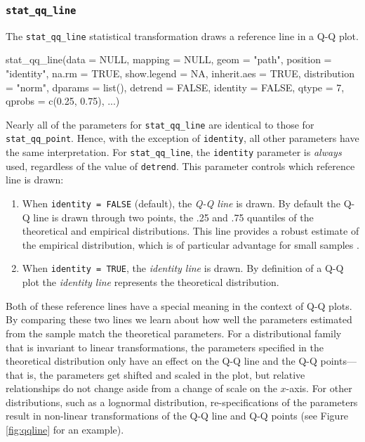 \subsubsection{\texorpdfstring{\texttt{stat\_qq\_line}}{stat\_qq\_line}}\label{stat_qq_line}

The \texttt{stat\_qq\_line} statistical transformation draws a reference
line in a Q-Q plot.

\begin{Schunk}
\begin{Sinput}
stat_qq_line(data = NULL,
             mapping = NULL,
             geom = "path",
             position = "identity",
             na.rm = TRUE,
             show.legend = NA,
             inherit.aes = TRUE,
             distribution = "norm",
             dparams = list(),
             detrend = FALSE,
             identity = FALSE,
             qtype = 7,
             qprobs = c(0.25, 0.75),
             ...)
\end{Sinput}
\end{Schunk}

Nearly all of the parameters for \texttt{stat\_qq\_line} are identical
to those for \texttt{stat\_qq\_point}. Hence, with the exception of
\texttt{identity}, all other parameters have the same interpretation.
For \texttt{stat\_qq\_line}, the \texttt{identity} parameter is
\emph{always} used, regardless of the value of \texttt{detrend}. This
parameter controls which reference line is drawn:

\begin{enumerate}
\def\labelenumi{\alph{enumi})}
\tightlist
\item
  When \texttt{identity\ =\ FALSE} (default), the \emph{Q-Q line} is
  drawn. By default the Q-Q line is drawn through two points, the .25
  and .75 quantiles of the theoretical and empirical distributions. This
  line provides a robust estimate of the empirical distribution, which
  is of particular advantage for small samples \citep{Loy2016-fg}.
\item
  When \texttt{identity\ =\ TRUE}, the \emph{identity line} is drawn. By
  definition of a Q-Q plot the \emph{identity line} represents the
  theoretical distribution.
\end{enumerate}

Both of these reference lines have a special meaning in the context of
Q-Q plots. By comparing these two lines we learn about how well the
parameters estimated from the sample match the theoretical parameters.
For a distributional family that is invariant to linear transformations,
the parameters specified in the theoretical distribution only have an
effect on the Q-Q line and the Q-Q points---that is, the parameters get
shifted and scaled in the plot, but relative relationships do not change
aside from a change of scale on the \(x\)-axis. For other distributions,
such as a lognormal distribution, re-specifications of the parameters
result in non-linear transformations of the Q-Q line and Q-Q points (see
Figure \ref{fig:qqline} for an example).

